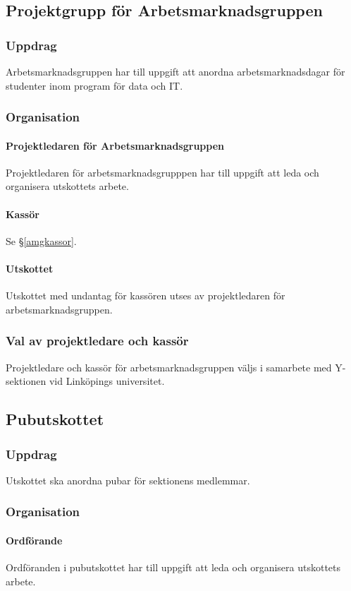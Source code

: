 \documentclass{datateknologsektionen-document}
\begin{document}
\subsection{Projektgrupp för Arbetsmarknadsgruppen}
\label{amg}
\subsubsection{Uppdrag}
Arbetsmarknadsgruppen har till uppgift att anordna arbetsmarknadsdagar för studenter inom
program för data och IT.
\subsubsection{Organisation}
\paragraph{Projektledaren för Arbetsmarknadsgruppen}
Projektledaren för arbetsmarknadsgrupppen har till uppgift att leda och organisera
utskottets arbete.
\paragraph{Kassör}
Se \S \ref{amgkassor}.
\paragraph{Utskottet}
Utskottet med undantag för kassören utses av projektledaren för arbetsmarknadsgruppen.
\subsubsection{Val av projektledare och kassör}
Projektledare och kassör för arbetsmarknadsgruppen väljs i samarbete med Y-sektionen vid
Linköpings universitet.

\subsection{Pubutskottet}
\label{pubu}
\subsubsection{Uppdrag}
Utskottet ska anordna pubar för sektionens medlemmar.
\subsubsection{Organisation}
\paragraph{Ordförande}
Ordföranden i pubutskottet har till uppgift att leda och organisera utskottets arbete.
\end{document}
